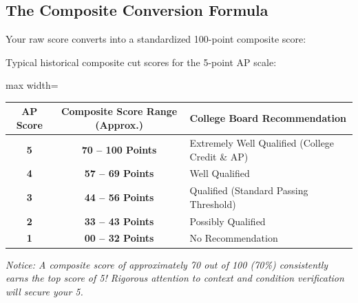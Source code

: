 \subsection*{The Composite Conversion Formula}
Your raw score converts into a standardized 100-point composite score:
\begin{center}
\end{center}
Typical historical composite cut scores for the 5-point AP scale:
\begin{center}
\begin{adjustbox}{max width=\linewidth}
\begin{tabular}{ccl}
\toprule
\textbf{AP Score} & \textbf{Composite Score Range (Approx.)} & \textbf{College Board Recommendation} \\
\midrule
\textbf{5} & \textbf{70 -- 100 Points} & Extremely Well Qualified (College Credit \& AP) \\
\textbf{4} & \textbf{57 -- 69 Points} & Well Qualified \\
\textbf{3} & \textbf{44 -- 56 Points} & Qualified (Standard Passing Threshold) \\
\textbf{2} & \textbf{33 -- 43 Points} & Possibly Qualified \\
\textbf{1} & \textbf{00 -- 32 Points} & No Recommendation \\
\bottomrule
\end{tabular}
\end{adjustbox}
\end{center}
\textit{Notice: A composite score of approximately 70 out of 100 (70\%) consistently earns the top score of 5! Rigorous attention to context and condition verification will secure your 5.}

